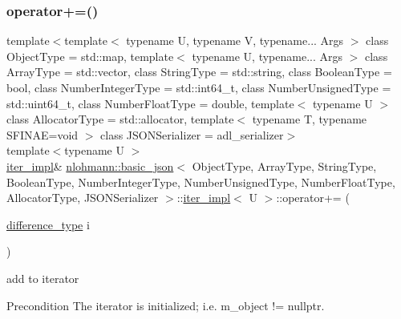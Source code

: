 \subsubsection{\texorpdfstring{operator+=()}{operator+=()}}
{\footnotesize\ttfamily template$<$template$<$ typename U, typename V, typename... Args $>$ class Object\+Type = std\+::map, template$<$ typename U, typename... Args $>$ class Array\+Type = std\+::vector, class String\+Type  = std\+::string, class Boolean\+Type  = bool, class Number\+Integer\+Type  = std\+::int64\+\_\+t, class Number\+Unsigned\+Type  = std\+::uint64\+\_\+t, class Number\+Float\+Type  = double, template$<$ typename U $>$ class Allocator\+Type = std\+::allocator, template$<$ typename T, typename S\+F\+I\+N\+A\+E=void $>$ class J\+S\+O\+N\+Serializer = adl\+\_\+serializer$>$ \\
template$<$typename U $>$ \\
\hyperlink{classnlohmann_1_1basic__json_1_1iter__impl}{iter\+\_\+impl}\& \hyperlink{classnlohmann_1_1basic__json}{nlohmann\+::basic\+\_\+json}$<$ Object\+Type, Array\+Type, String\+Type, Boolean\+Type, Number\+Integer\+Type, Number\+Unsigned\+Type, Number\+Float\+Type, Allocator\+Type, J\+S\+O\+N\+Serializer $>$\+::\hyperlink{classnlohmann_1_1basic__json_1_1iter__impl}{iter\+\_\+impl}$<$ U $>$\+::operator+= (\begin{DoxyParamCaption}\item[{\hyperlink{classnlohmann_1_1basic__json_1_1iter__impl_aa3d908ee643e5938d32e5f6d261d7715}{difference\+\_\+type}}]{i }\end{DoxyParamCaption})\hspace{0.3cm}{\ttfamily [inline]}}



add to iterator 

\begin{DoxyPrecond}{Precondition}
The iterator is initialized; i.\+e. {\ttfamily m\+\_\+object != nullptr}. 
\end{DoxyPrecond}
\mbox{\label{classnlohmann_1_1basic__json_1_1iter__impl_a926f2f9189403e72e4f694a06d4d021a}} 
